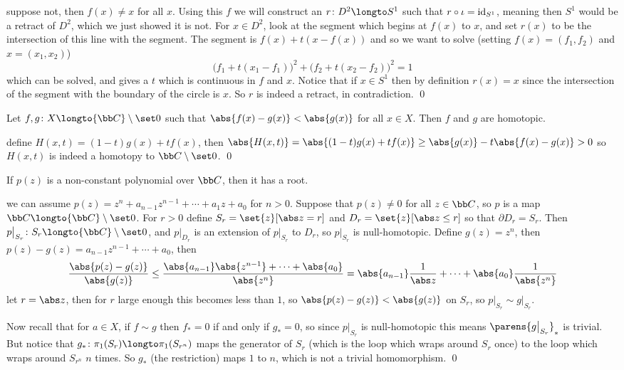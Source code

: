 \ethrm

\Proof suppose not, then $f(x)\neq x$ for all $x$.
Using this $f$ we will construct an $r\colon D^2\longto S^1$ such that $r\circ\iota={\rm id}_{S^1}$, meaning then $S^1$ would be a retract of $D^2$, which we just showed it is not.
For $x\in D^2$, look at the segment which begins at $f(x)$ to $x$, and set $r(x)$ to be the intersection of this line with the segment.
The segment is $f(x)+t(x-f(x))$ and so we want to solve (setting $f(x)=(f_1,f_2)$ and $x=(x_1,x_2)$)
$$ \bigl(f_1+t(x_1-f_1)\bigr)^2 + \bigl(f_2+t(x_2-f_2)\bigr)^2 = 1 $$
which can be solved, and gives a $t$ which is continuous in $f$ and $x$.
Notice that if $x\in S^1$ then by definition $r(x)=x$ since the intersection of the segment with the boundary of the circle is $x$.
So $r$ is indeed a retract, in contradiction.
\qed

\blemm

    Let $f,g\colon X\longto{\bb C}\setminus\set0$ such that $\abs{f(x)-g(x)}<\abs{g(x)}$ for all $x\in X$.
    Then $f$ and $g$ are homotopic.

\elemm

\Proof define $H(x,t)=(1-t)g(x)+tf(x)$, then $\abs{H(x,t)}=\abs{(1-t)g(x)+tf(x)}\geq\abs{g(x)}-t\abs{f(x)-g(x)}>0$ so $H(x,t)$ is indeed a homotopy to ${\bb C}\setminus\set0$.
\qed

\bthrm[title=The Fundamental Theorem of Algebra]

    If $p(z)$ is a non-constant polynomial over ${\bb C}$, then it has a root.

\ethrm

\Proof we can assume $p(z)=z^n+a_{n-1}z^{n-1}+\cdots+a_1z+a_0$ for $n>0$.
Suppose that $p(z)\neq0$ for all $z\in{\bb C}$, so $p$ is a map ${\bb C}\longto{\bb C}\setminus\set0$.
For $r>0$ define $S_r=\set{z}[\abs z=r]$ and $D_r=\set{z}[\abs z\leq r]$ so that $\partial D_r=S_r$.
Then $p\bigl|_{S_r}\colon S_r\longto{\bb C}\setminus\set0$, and $p\bigl|_{D_r}$ is an extension of $p\bigl|_{S_r}$ to $D_r$, so $p\bigl|_{S_r}$ is null-homotopic.
Define $g(z)=z^n$, then $p(z)-g(z)=a_{n-1}z^{n-1}+\cdots+a_0$, then
$$ \frac{\abs{p(z)-g(z)}}{\abs{g(z)}} \leq \frac{\abs{a_{n-1}}\abs{z^{n-1}}+\cdots+\abs{a_0}}{\abs{z^n}} = \abs{a_{n-1}}\frac1{\abs z}+\cdots+\abs{a_0}\frac1{\abs{z^n}} $$
let $r=\abs z$, then for $r$ large enough this becomes less than $1$, so $\abs{p(z)-g(z)}<\abs{g(z)}$ on $S_r$, so $p\bigl|_{S_r}\sim g\bigl|_{S_r}$.

Now recall that for $a\in X$, if $f\sim g$ then $f_*=0$ if and only if $g_*=0$, so since $p\bigl|_{S_r}$ is null-homotopic this means $\parens{g\bigl|_{S_r}}_*$ is trivial.
But notice that $g_*\colon\pi_1(S_r)\longto\pi_1(S_{r^n})$ maps the generator of $S_r$ (which is the loop which wraps around $S_r$ once) to the loop which wraps around $S_{r^n}$ $n$ times.
So $g_*$ (the restriction) maps $1$ to $n$, which is not a trivial homomorphism.
\qed

